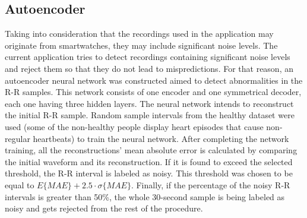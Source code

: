 \subsection{Autoencoder}
\label{ssec:autoencoder}
Taking into consideration that the recordings used in the application may originate from smartwatches, they may include significant noise levels. The current application tries to detect recordings containing significant noise levels and reject them so that they do not lead to mispredictions. For that reason, an autoencoder neural network was constructed aimed to detect abnormalities in the R-R samples. This network consists of one encoder and one symmetrical decoder, each one having three hidden layers. The neural network intends to reconstruct the initial R-R sample. Random sample intervals from the healthy dataset were used (some of the non-healthy people display heart episodes that cause non-regular heartbeats) to train the neural network. After completing the network training, all the reconstructions' mean absolute error is calculated by comparing the initial waveform and its reconstruction. If it is found to exceed the selected threshold, the R-R interval is labeled as noisy. This threshold was chosen to be equal to $E\{MAE\} + 2.5 \cdot\sigma\{MAE\}$. Finally, if the percentage of the noisy R-R intervals is greater than 50\%, the whole 30-second sample is being labeled as noisy and gets rejected from the rest of the procedure.
%
